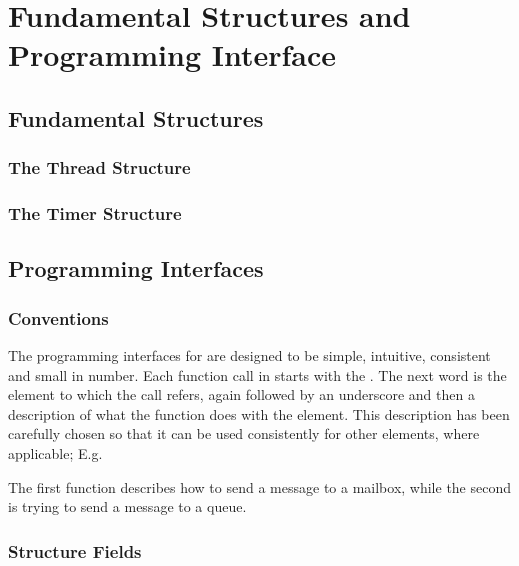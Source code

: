 \chapter{Fundamental Structures and Programming Interface}

\section{Fundamental Structures}





\subsection{The Thread Structure}

\subsection{The Timer Structure}

\section{Programming Interfaces}

\subsection{Conventions}

The programming interfaces for \oswald are designed to be simple, intuitive,
consistent and small in number. Each function call in \oswald starts with the
. The next word is the element to which the call refers, again
followed by an underscore and then a description of what the function does
with the element. This description has been carefully chosen so that it can
be used consistently for other elements, where applicable; E.g.



The first function describes how to send a message to a mailbox, while the
second is trying to send a message to a queue.

\subsection{Structure Fields}

